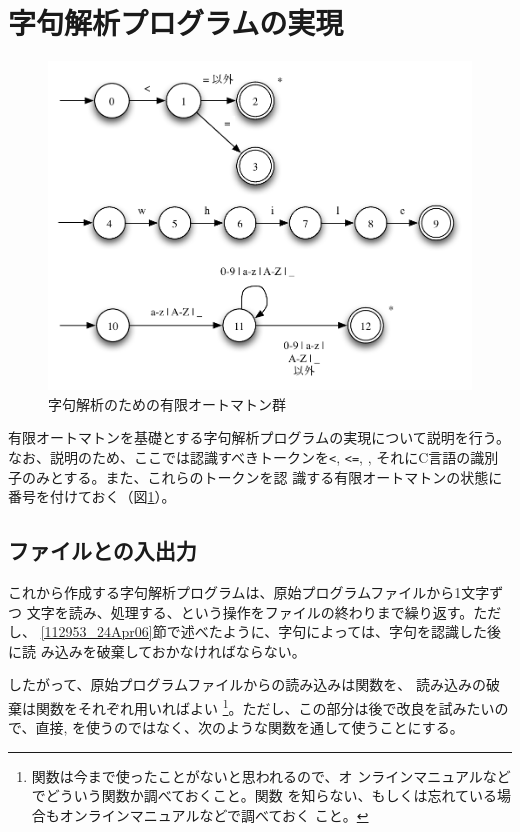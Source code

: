 \section{字句解析プログラムの実現}
\label{170501_24Apr06}

\begin{figure}
 \begin{center}
  \includegraphics[width=13cm]{figure/lexical_analysis_example.pdf}
 \end{center}
 \caption{字句解析のための有限オートマトン群}
 \label{112450_24Apr06}
\end{figure}

有限オートマトンを基礎とする字句解析プログラムの実現について説明を行う。
なお、説明のため、ここでは認識すべきトークンを\verb|<|, \verb|<=|,
, それにC言語の識別子のみとする。また、これらのトークンを認
識する有限オートマトンの状態に番号を付けておく（図\ref{112450_24Apr06}）。

\subsection{ファイルとの入出力}

これから作成する字句解析プログラムは、原始プログラムファイルから1文字ずつ
文字を読み、処理する、という操作をファイルの終わりまで繰り返す。ただし、
\ref{112953_24Apr06}節で述べたように、字句によっては、字句を認識した後に読
み込みを破棄しておかなければならない。

したがって、原始プログラムファイルからの読み込みは関数を、
読み込みの破棄は関数をそれぞれ用いればよい
\footnote{関数は今まで使ったことがないと思われるので、オ
ンラインマニュアルなどでどういう関数か調べておくこと。関数
を知らない、もしくは忘れている場合もオンラインマニュアルなどで調べておく
こと。}。ただし、この部分は後で改良を試みたいので、直接,
を使うのではなく、次のような関数を通して使うことにする。

